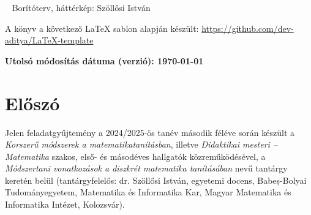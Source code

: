 \documentclass[magyar]{package/fancy-book}
\begin{document}
	


\newpage
\thispagestyle{plain}
~
\vfill
\noindent Borítóterv, háttérkép: Szöllősi István

\vspace*{1em}

\noindent A könyv a következő \LaTeX{} sablon alapján készült: \href{https://github.com/dev-aditya/LaTeX-template}{https://github.com/dev-aditya/LaTeX-template}

\vspace*{1em}

\noindent\textbf{Utolsó módosítás dátuma (verzió): \version\today}



\newpage

\tableofcontents

\chapter*{Előszó}
\thispagestyle{plain}

Jelen feladatgyűjtemény a 2024/2025-ös tanév második féléve során
készült a \emph{Korszerű módszerek a matematikatanításban}, illetve
\emph{Didaktikai mesteri -- Matematika} szakos, első- és másodéves
hallgatók közreműködésével, a \emph{Módszertani vonatkozások a diszkrét
matematika tanításában} nevű tantárgy keretén belül (tantárgyfelelős:
dr. Szöllősi István, egyetemi docens, Babeș-Bolyai Tudományegyetem, Matematika és Informatika
Kar, Magyar Matematika és Informatika Intézet, Kolozsvár). 
\end{document}
